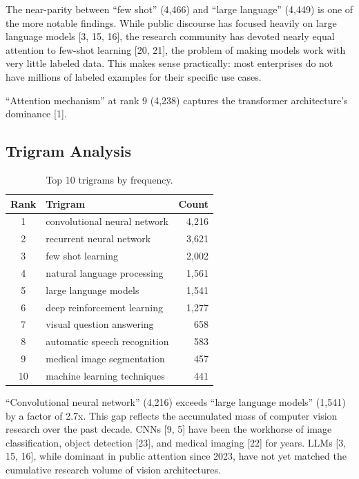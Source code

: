 \documentclass[11pt]{article}
\begin{document}
The near-parity between ``few shot'' (4,466) and ``large language'' (4,449) is one of the more notable findings. While public discourse has focused heavily on large language models [3, 15, 16], the research community has devoted nearly equal attention to few-shot learning [20, 21], the problem of making models work with very little labeled data. This makes sense practically: most enterprises do not have millions of labeled examples for their specific use cases.

``Attention mechanism'' at rank 9 (4,238) captures the transformer architecture's dominance [1].

\subsection{Trigram Analysis}

\begin{table}[h]
\centering
\caption{Top 10 trigrams by frequency.}
\label{tab:trigrams}
\begin{tabular}{@{}clr@{}}
\toprule
Rank & Trigram & Count \\
\midrule
1 & convolutional neural network & 4,216 \\
2 & recurrent neural network & 3,621 \\
3 & few shot learning & 2,002 \\
4 & natural language processing & 1,561 \\
5 & large language models & 1,541 \\
6 & deep reinforcement learning & 1,277 \\
7 & visual question answering & 658 \\
8 & automatic speech recognition & 583 \\
9 & medical image segmentation & 457 \\
10 & machine learning techniques & 441 \\
\bottomrule
\end{tabular}
\end{table}

``Convolutional neural network'' (4,216) exceeds ``large language models'' (1,541) by a factor of 2.7x. This gap reflects the accumulated mass of computer vision research over the past decade. CNNs [9, 5] have been the workhorse of image classification, object detection [23], and medical imaging [22] for years. LLMs [3, 15, 16], while dominant in public attention since 2023, have not yet matched the cumulative research volume of vision architectures.
\end{document}
